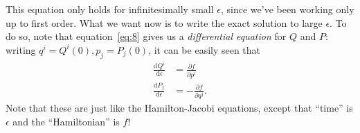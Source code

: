 \documentclass[11pt,a4]{article}
\newcommand{\de}{\mathrm{d}}
\newcommand{\tdev}[2]{\frac{\de #1}{\de #2}}
\newcommand{\pdev}[2]{\frac{\partial #1}{\partial #2}}
\begin{document}
This equation only holds for infinitesimally small $\epsilon$, since we've been working only up to first order. What we want now is to write the exact solution  to large $\epsilon$. To do so, note that equation~\eqref{eq:8}
gives us a \emph{differential equation} for $Q$ and $P$: writing $q^i=Q^i(0), p_j=P_j(0)$, it can be easily seen that
\begin{equation}
  \label{eq:13}
  \begin{aligned}
    \tdev{Q^i}{\epsilon} &= \pdev{f}{p^i}\\
    \tdev{P_j}{\epsilon} &= -\pdev{f}{q^j}.
  \end{aligned}
\end{equation}
Note that these are just like the Hamilton-Jacobi equations, except that ``time'' is $\epsilon$ and the ``Hamiltonian''
is $f$!
\end{document}
